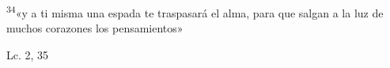 \documentclass[../../rosario.tex]{subfiles}
\begin{document}
    \textsuperscript{34}«y a ti misma una espada te traspasará el alma, para que salgan a la luz de muchos corazones los pensamientos»
    \begin{flushright}
    Lc. 2, 35         
    \end{flushright} 
\end{document}
